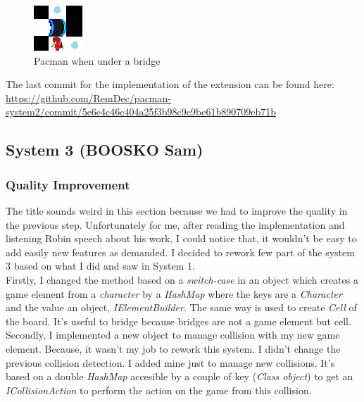 \documentclass[]{article}
\begin{document}
\begin{figure}[h!]
\centering
\includegraphics[width=0.2\linewidth]{bridge3.png}
\caption{Pacman when under a bridge}
\label{fig:bridge}
\end{figure}

The last commit for the implementation of the extension can be found here: \url{https://github.com/RemDec/pacman-system2/commit/5e6e4c46c404a25f3b98c9e9be61b890709eb71b}
\newpage
\subsection{System 3 (BOOSKO Sam)}

\subsubsection{Quality Improvement}

The title sounds weird in this section because we had to improve the quality in the previous step. Unfortunately for me, after reading the implementation and listening Robin speech about his work, I could notice that, it wouldn't be easy to add easily new features as demanded. I decided to rework few part of the system 3 based on what I did and saw in System 1.\\

Firstly, I changed the method based on a \textit{switch-case} in an object which creates a game element from a \textit{character} by a \textit{HashMap} where the keys are a \textit{Character} and the value an object, \textit{IElementBuilder}. The same way is used to create \textit{Cell} of the board. It's useful to bridge because bridges are not a game element but cell.\\

Secondly, I implemented a new object to manage collision with my new game element. Because, it wasn't my job to rework this system. I didn't change the previous collision detection. I added mine just to manage new collisions. It's based on a double \textit{HashMap} accesible by a couple of key (\textit{Class object}) to get an \textit{ICollisionAction} to perform the action on the game from this collision. \\
\end{document}
